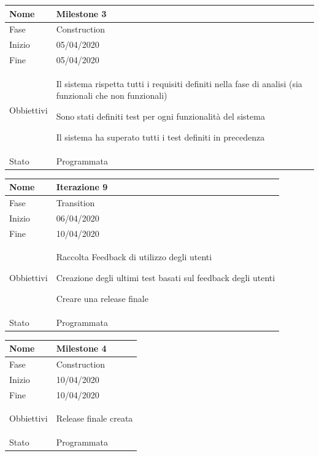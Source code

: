 \begin{center}
\begin{tabular}{ |p{2cm}|p{10cm}|  }
\hline
Nome & Milestone 3\\\hline
Fase & Construction \\\hline
Inizio & 05/04/2020 \\\hline
Fine &  05/04/2020 \\\hline
Obbiettivi & 
	\begin{compactitem}
		\item Il sistema rispetta tutti i requisiti definiti nella fase di analisi (sia funzionali che non funzionali)
		\item Sono stati definiti test per ogni funzionalità del sistema
		\item Il sistema ha superato tutti i test definiti in precedenza
	\end{compactitem}\\\hline
Stato &  Programmata \\\hline
\end{tabular}
\label{table:milestone4}\newline

\begin{tabular}{ |p{2cm}|p{10cm}|  }
\hline
Nome & Iterazione 9 \\\hline
Fase & Transition \\\hline
Inizio & 06/04/2020 \\\hline
Fine &  10/04/2020  \\\hline
Obbiettivi & 
	\begin{compactitem}
		\item Raccolta Feedback di utilizzo degli utenti
		\item Creazione degli ultimi test basati sul feedback degli utenti
		\item Creare una release finale
	\end{compactitem}\\\hline
Stato &  Programmata \\\hline
\end{tabular}
\label{table:9}\newline

\begin{tabular}{ |p{2cm}|p{10cm}|  }
\hline
Nome & Milestone 4\\\hline
Fase & Construction \\\hline
Inizio & 10/04/2020 \\\hline
Fine &  10/04/2020 \\\hline
Obbiettivi & 
	\begin{compactitem}
		\item Release finale creata
	\end{compactitem}\\\hline
Stato &  Programmata \\\hline
\end{tabular}
\label{table:milestone5}\newline


\end{center}

